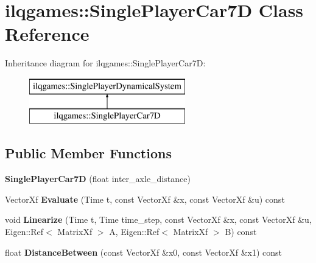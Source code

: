 \hypertarget{classilqgames_1_1_single_player_car7_d}{}\section{ilqgames\+:\+:Single\+Player\+Car7D Class Reference}
\label{classilqgames_1_1_single_player_car7_d}
Inheritance diagram for ilqgames\+:\+:Single\+Player\+Car7D\+:\begin{figure}[H]
\begin{center}
\leavevmode
\includegraphics[height=2.000000cm]{classilqgames_1_1_single_player_car7_d}
\end{center}
\end{figure}
\subsection*{Public Member Functions}
\begin{DoxyCompactItemize}
\item 
{\bfseries Single\+Player\+Car7D} (float inter\+\_\+axle\+\_\+distance)\hypertarget{classilqgames_1_1_single_player_car7_d_a31ca08f1230c5c180d8b1f55230f4c49}{}\label{classilqgames_1_1_single_player_car7_d_a31ca08f1230c5c180d8b1f55230f4c49}

\item 
Vector\+Xf {\bfseries Evaluate} (Time t, const Vector\+Xf \&x, const Vector\+Xf \&u) const \hypertarget{classilqgames_1_1_single_player_car7_d_a84d452cb5dd31f143d75def83a14f4c3}{}\label{classilqgames_1_1_single_player_car7_d_a84d452cb5dd31f143d75def83a14f4c3}

\item 
void {\bfseries Linearize} (Time t, Time time\+\_\+step, const Vector\+Xf \&x, const Vector\+Xf \&u, Eigen\+::\+Ref$<$ Matrix\+Xf $>$ A, Eigen\+::\+Ref$<$ Matrix\+Xf $>$ B) const \hypertarget{classilqgames_1_1_single_player_car7_d_a206924124fe73eefa173f4e9c52a1c6d}{}\label{classilqgames_1_1_single_player_car7_d_a206924124fe73eefa173f4e9c52a1c6d}

\item 
float {\bfseries Distance\+Between} (const Vector\+Xf \&x0, const Vector\+Xf \&x1) const \hypertarget{classilqgames_1_1_single_player_car7_d_a409dce5e2bb27fabd19057fb5084187f}{}\label{classilqgames_1_1_single_player_car7_d_a409dce5e2bb27fabd19057fb5084187f}

\end{DoxyCompactItemize}
